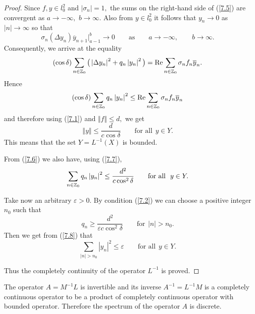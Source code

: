 \documentclass[pdftex]{sigma}
\numberwithin{equation}{section}
\begin{document}
\begin{proof}
Since $f,y\in l_{0}^{2}$ and $\left\vert \sigma _{n}\right\vert =1,$ the
sums on the right-hand side of (\ref{7.5}) are convergent as $a\rightarrow
-\infty ,$ $b\rightarrow \infty .$ Also from $y\in l_{0}^{2}$ it follows
that $y_{n}\rightarrow 0$ as $\left\vert n\right\vert \rightarrow \infty $
so that%
\[
\sigma _{n}(\Delta y_{n})\overline{y}_{n+1}\big|_{a-1}^{b}\rightarrow 0\qquad \text{as} \qquad a\rightarrow -\infty ,\qquad b\rightarrow \infty .
\]
Consequently, we arrive at the equality%
\[
(\cos \delta )\sum_{n\in
\mathbb{Z}
_{0}}\big( \left\vert \Delta y_{n}\right\vert ^{2}+q_{n}\left\vert
y_{n}\right\vert ^{2}\big) ={\rm Re}\sum_{n\in
\mathbb{Z}
_{0}}\sigma _{n}f_{n}\overline{y}_{n}.
\]%
Hence%
\begin{equation}
(\cos \delta )\sum_{n\in
\mathbb{Z}
_{0}}q_{n}\left\vert y_{n}\right\vert ^{2}\leq {\rm Re}\sum_{n\in
\mathbb{Z}
_{0}}\sigma _{n}f_{n}\overline{y}_{n}  \label{7.6}
\end{equation}%
and therefore using (\ref{7.1}) and $\left\Vert f\right\Vert \leq d,$ we get{\samepage
\begin{equation}
\left\Vert y\right\Vert \leq \frac{d}{c\cos \delta }\qquad \text{for all} \ \
y\in Y.  \label{7.7}
\end{equation}%
This means that the set $Y=L^{-1}(X)$ is bounded.}

From (\ref{7.6}) we also have, using (\ref{7.7}),%
\begin{equation}
\sum_{n\in \mathbf{%
\mathbb{Z}
}_{0}}q_{n}\left\vert y_{n}\right\vert ^{2}\leq \frac{d^{2}}{c\cos
^{2}\delta } \qquad \text{for all} \ \ y\in Y.  \label{7.8}
\end{equation}

Take now an arbitrary $\varepsilon >0$. By condition (\ref{7.2}) we can
choose a positive integer $n_{0}$ such that
\[
q_{n}\geq \frac{d^{2}}{\varepsilon c\cos ^{2}\delta } \qquad \text{for} \ \
\left\vert n\right\vert >n_{0}.
\]%
Then we get from (\ref{7.8}) that
\[
\sum_{\left\vert n\right\vert >n_{0}}\left\vert y_{n}\right\vert ^{2}\leq
\varepsilon \qquad \text{for all} \ \ y\in Y.
\]

Thus the completely continuity of the operator $L^{-1}$ is proved.
\end{proof}

\begin{corollary}
\label{Cor7.2} The operator $A=M^{-1}L$ is invertible and its inverse $A^{-1}=L^{-1}M$ is a completely continuous operator to be a product of
completely continuous operator with bounded operator. Therefore the spectrum
of the operator $A$ is discrete.
\end{corollary}
\end{document}
